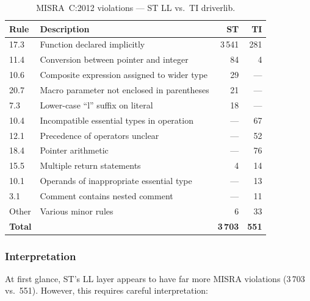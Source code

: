 \begin{table}[H]
\centering
\caption{MISRA~C:2012 violations --- ST LL vs.\ TI driverlib.}
\label{tab:ti-misra}
\begin{tabular}{l l r r}
\toprule
\textbf{Rule} & \textbf{Description} & \textbf{ST} & \textbf{TI} \\
\midrule
17.3 & Function declared implicitly       & 3\,541 &  281 \\
11.4 & Conversion between pointer and integer & 84 &    4 \\
10.6 & Composite expression assigned to wider type & 29 & --- \\
20.7 & Macro parameter not enclosed in parentheses & 21 & --- \\
7.3  & Lower-case ``l'' suffix on literal  &    18 & --- \\
10.4 & Incompatible essential types in operation & --- & 67 \\
12.1 & Precedence of operators unclear     & --- &   52 \\
18.4 & Pointer arithmetic                  & --- &   76 \\
15.5 & Multiple return statements          &     4 &   14 \\
10.1 & Operands of inappropriate essential type & --- & 13 \\
3.1  & Comment contains nested comment     & --- &   11 \\
Other & Various minor rules                &    6 &   33 \\
\midrule
\textbf{Total} & & \textbf{3\,703} & \textbf{551} \\
\bottomrule
\end{tabular}
\end{table}

\subsubsection*{Interpretation}
At first glance, ST's LL layer appears to have far more MISRA violations (3\,703 vs.\ 551).
However, this requires careful interpretation:

